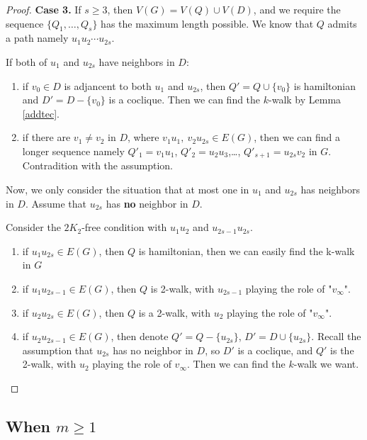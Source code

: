 \documentclass{amsart}
\theoremstyle{definition}
\begin{document}
\begin{proof}
{\bf Case 3.} If $s\ge3$, then $V(G)=V(Q)\cup V(D)$, and we require the sequence $\{Q_1,\ldots,Q_s\}$ has the maximum length possible. We know that $Q$ admits a path namely $u_1u_2\cdots u_{2s}$.

If both of $u_1$ and $u_{2s}$ have neighbors in $D$:
\begin{enumerate}
\item if $v_0\in D$ is adjancent to both $u_1$ and $u_{2s}$, then $Q'=Q\cup\{v_0\}$ is hamiltonian and $D'=D-\{v_0\}$ is a coclique. Then we can find the $k$-walk by Lemma \ref{addtec}.
\item if there are $v_1\neq v_2$ in $D$, where $v_1u_1,~v_2u_{2s}\in E(G)$, then we can find a longer sequence namely $Q'_1=v_1u_1$, $Q'_2=u_2u_3$,\ldots, $Q'_{s+1}=u_{2s}v_2$ in $G$. Contradition with the assumption.
\end{enumerate}

Now, we only consider the situation that at most one in $u_1$ and $u_{2s}$ has neighbors in $D$. Assume that $u_{2s}$ has {\bf no} neighbor in $D$.

Consider the $2K_2$-free condition with $u_1u_2$ and $u_{2s-1}u_{2s}$.
\begin{enumerate}
\item if $u_1u_{2s}\in E(G)$, then $Q$ is hamiltonian, then we can easily find the k-walk in $G$
\item if $u_1u_{2s-1}\in E(G)$, then $Q$ is 2-walk, with $u_{2s-1}$ playing the role of "$v_{\infty}$".
\item if $u_2u_{2s}\in E(G)$, then $Q$ is a 2-walk, with $u_2$ playing the role of "$v_{\infty}$".
\item if $u_2u_{2s-1}\in E(G)$, then denote $Q'=Q-\{u_{2s}\}$, $D'=D\cup \{u_{2s}\}$. Recall the assumption that $u_{2s}$ has no neighbor in $D$, so $D'$ is a coclique, and $Q'$ is the 2-walk, with $u_2$ playing the role of $v_{\infty}$. Then we can find the $k$-walk we want.
\end{enumerate}

\end{proof}


















\subsection{When $m\ge1$} 
\end{document}
